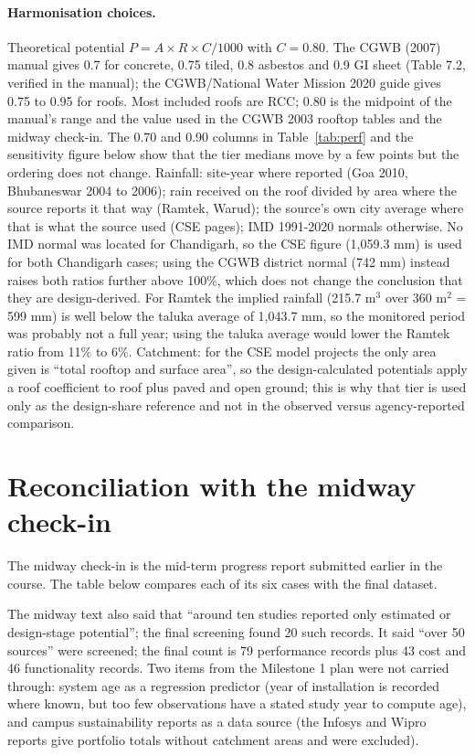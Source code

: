 \paragraph{Harmonisation choices.} Theoretical potential $P = A \times R \times C/1000$ with $C = 0.80$. The CGWB (2007) manual gives 0.7 for concrete, 0.75 tiled, 0.8 asbestos and 0.9 GI sheet (Table 7.2, verified in the manual); the CGWB/National Water Mission 2020 guide gives 0.75 to 0.95 for roofs. Most included roofs are RCC; 0.80 is the midpoint of the manual's range and the value used in the CGWB 2003 rooftop tables and the midway check-in. The 0.70 and 0.90 columns in Table~\ref{tab:perf} and the sensitivity figure below show that the tier medians move by a few points but the ordering does not change. Rainfall: site-year where reported (Goa 2010, Bhubaneswar 2004 to 2006); rain received on the roof divided by area where the source reports it that way (Ramtek, Warud); the source's own city average where that is what the source used (CSE pages); IMD 1991-2020 normals otherwise. No IMD normal was located for Chandigarh, so the CSE figure (1,059.3 mm) is used for both Chandigarh cases; using the CGWB district normal (742 mm) instead raises both ratios further above 100\%, which does not change the conclusion that they are design-derived. For Ramtek the implied rainfall (215.7 m$^3$ over 360 m$^2$ = 599 mm) is well below the taluka average of 1,043.7 mm, so the monitored period was probably not a full year; using the taluka average would lower the Ramtek ratio from 11\% to 6\%. Catchment: for the CSE model projects the only area given is ``total rooftop and surface area'', so the design-calculated potentials apply a roof coefficient to roof plus paved and open ground; this is why that tier is used only as the design-share reference and not in the observed versus agency-reported comparison.

\section{Reconciliation with the midway check-in}
The midway check-in is the mid-term progress report submitted earlier in the course. The table below compares each of its six cases with the final dataset.

The midway text also said that ``around ten studies reported only estimated or design-stage potential''; the final screening found 20 such records. It said ``over 50 sources'' were screened; the final count is 79 performance records plus 43 cost and 46 functionality records. Two items from the Milestone 1 plan were not carried through: system age as a regression predictor (year of installation is recorded where known, but too few observations have a stated study year to compute age), and campus sustainability reports as a data source (the Infosys and Wipro reports give portfolio totals without catchment areas and were excluded).


